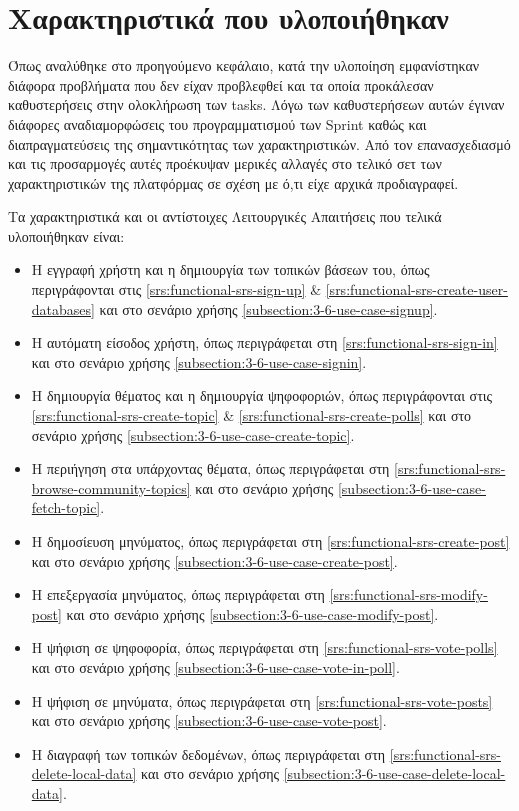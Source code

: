 \section{Χαρακτηριστικά που υλοποιήθηκαν} \label{section:4-5-implemented-parts}

Όπως αναλύθηκε στο προηγούμενο κεφάλαιο, κατά την υλοποίηση εμφανίστηκαν διάφορα προβλήματα που δεν είχαν προβλεφθεί και τα οποία προκάλεσαν καθυστερήσεις στην ολοκλήρωση των tasks. Λόγω των καθυστερήσεων αυτών έγιναν διάφορες αναδιαμορφώσεις του προγραμματισμού των Sprint καθώς και διαπραγματεύσεις της σημαντικότητας των χαρακτηριστικών. Από τον επανασχεδιασμό και τις προσαρμογές αυτές προέκυψαν μερικές αλλαγές στο τελικό σετ των χαρακτηριστικών της πλατφόρμας σε σχέση με ό,τι είχε αρχικά προδιαγραφεί.

Τα χαρακτηριστικά και οι αντίστοιχες Λειτουργικές Απαιτήσεις που τελικά υλοποιήθηκαν είναι:

\begin{itemize}
    \item Η εγγραφή χρήστη και η δημιουργία των τοπικών βάσεων του, όπως περιγράφονται στις \ref{srs:functional-srs-sign-up} \& \ref{srs:functional-srs-create-user-databases} και στο σενάριο χρήσης \ref{subsection:3-6-use-case-signup}.
    \item Η αυτόματη είσοδος χρήστη, όπως περιγράφεται στη \ref{srs:functional-srs-sign-in} και στο σενάριο χρήσης \ref{subsection:3-6-use-case-signin}.
    \item Η δημιουργία θέματος και η δημιουργία ψηφοφοριών, όπως περιγράφονται στις \ref{srs:functional-srs-create-topic} \& \ref{srs:functional-srs-create-polls} και στο σενάριο χρήσης \ref{subsection:3-6-use-case-create-topic}.
    \item Η περιήγηση στα υπάρχοντας θέματα, όπως περιγράφεται στη \ref{srs:functional-srs-browse-community-topics} και στο σενάριο χρήσης \ref{subsection:3-6-use-case-fetch-topic}.
    \item Η δημοσίευση μηνύματος, όπως περιγράφεται στη \ref{srs:functional-srs-create-post} και στο σενάριο χρήσης \ref{subsection:3-6-use-case-create-post}.
    \item Η επεξεργασία μηνύματος, όπως περιγράφεται στη \ref{srs:functional-srs-modify-post} και στο σενάριο χρήσης \ref{subsection:3-6-use-case-modify-post}.
    \item Η ψήφιση σε ψηφοφορία, όπως περιγράφεται στη \ref{srs:functional-srs-vote-polls} και στο σενάριο χρήσης \ref{subsection:3-6-use-case-vote-in-poll}.
    \item Η ψήφιση σε μηνύματα, όπως περιγράφεται στη \ref{srs:functional-srs-vote-posts} και στο σενάριο χρήσης \ref{subsection:3-6-use-case-vote-post}.
    \item Η διαγραφή των τοπικών δεδομένων, όπως περιγράφεται στη \ref{srs:functional-srs-delete-local-data} και στο σενάριο χρήσης \ref{subsection:3-6-use-case-delete-local-data}.
\end{itemize}

